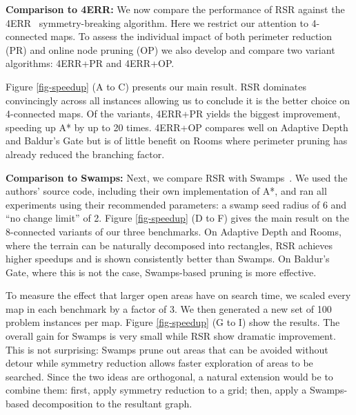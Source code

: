\textbf{Comparison to 4ERR: }
We now compare the performance of RSR against the 4ERR~\cite{harabor10} symmetry-breaking
algorithm. Here we restrict our attention to 4-connected maps.  To
assess the individual impact of both perimeter reduction (PR) and online node
pruning (OP) we also develop and compare two variant algorithms: 4ERR+PR and
4ERR+OP. 
\par
Figure \ref{fig-speedup} (A to C) presents our main result. RSR dominates
convincingly across all instances allowing us to conclude it is the better
choice on 4-connected maps. 
Of the variants, 4ERR+PR yields the biggest improvement, speeding up A* by up to 20 times.
4ERR+OP compares well on Adaptive Depth and Baldur's Gate but is of little benefit on 
Rooms where perimeter pruning has already reduced the branching factor.
\par
\textbf{Comparison to Swamps:}
Next, we compare RSR with Swamps~\cite{pochter10}.  
We used the authors' source code, including their own implementation of A*, and 
ran all experiments using their recommended parameters: a swamp seed radius of 6 
and ``no change limit'' of 2. Figure \ref{fig-speedup} (D to F) gives the main
result on the 8-connected variants of our three benchmarks.
On Adaptive Depth and Rooms, where the terrain can be naturally decomposed into
rectangles, RSR achieves higher speedups and is shown consistently better than Swamps. 
On Baldur's Gate, where this is not the case, Swamps-based pruning is more
effective. 
\par
To measure the effect that larger open areas have on search time, we scaled
every map in each benchmark by a factor of 3. We then generated a new set of 100
problem instances per map. Figure \ref{fig-speedup} (G
to I) show the results.  
The overall gain for Swamps is very small while RSR show dramatic improvement.
This is not surprising: Swamps prune out
areas that can be avoided without detour while symmetry reduction allows
faster exploration of areas to be searched.
Since the two ideas are orthogonal, a natural extension would be to combine them: 
first, apply symmetry reduction to a grid; then, apply a Swamps-based 
decomposition to the resultant graph.



